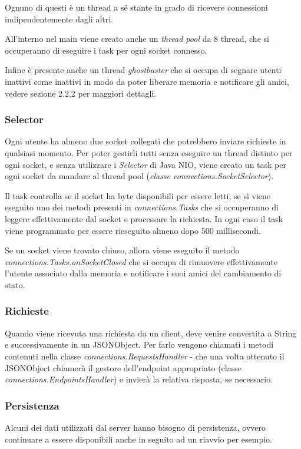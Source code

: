 Ognuno di questi è un thread a sé stante in grado di ricevere connessioni indipendentemente dagli altri.

All'interno nel main viene creato anche un \textit{thread pool} da 8 thread, che si occuperanno di eseguire i task per ogni socket connesso.

Infine è presente anche un thread \textit{ghostbuster} che si occupa di segnare utenti inattivi come inattivi in modo da poter liberare memoria e notificare gli amici, vedere sezione 2.2.2 per maggiori dettagli.

\subsubsection{Selector}
Ogni utente ha almeno due socket collegati che potrebbero inviare richieste in qualsiasi momento. Per poter gestirli tutti senza eseguire un thread distinto per ogni socket, e senza utilizzare i \textit{Selector} di Java NIO, viene creato un task per ogni socket da mandare al thread pool (\textit{classe connections.SocketSelector}).

Il task controlla se il socket ha byte disponibili per essere letti, se sì viene eseguito uno dei metodi presenti in \textit{connections.Tasks} che si occuperanno di leggere effettivamente dal socket e processare la richiesta. In ogni caso il task viene programmato per essere rieseguito almeno dopo 500 millisecondi.

Se un socket viene trovato chiuso, allora viene eseguito il metodo \textit{connections.Tasks.onSocketClosed} che si occupa di rimuovere effettivamente l'utente associato dalla memoria e notificare i suoi amici del cambiamento di stato.

\subsubsection{Richieste}
Quando viene ricevuta una richiesta da un client, deve venire convertita a String e successivamente in un JSONObject. Per farlo vengono chiamati i metodi contenuti nella classe \textit{connections.RequestsHandler} - che una volta ottenuto il JSONObject chiamerà il gestore dell'endpoint appropriato (classe \textit{connections.EndpointsHandler}) e invierà la relativa risposta, se necessario.

\subsubsection{Persistenza}
Alcuni dei dati utilizzati dal server hanno bisogno di persistenza, ovvero continuare a essere disponibili anche in seguito ad un riavvio per esempio.

